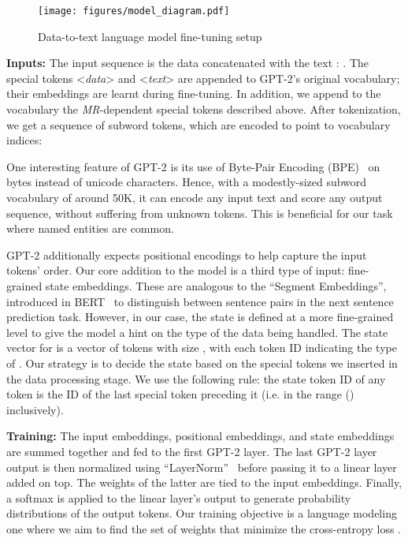 \documentclass[11pt]{article}
\newcommand{\mr}{\textit{MR}\xspace}
\theoremstyle{definition}
\theoremstyle{break}
\newcommand{\specialtoken}[1]{\mbox{\textless \textit{#1}\textgreater}}
\begin{document}
\begin{figure*}[h]
    \centering
    \texttt{[image: figures/model\_diagram.pdf]}
    \caption{Data-to-text language model fine-tuning setup}
    \label{fig:model_diagram}
    \vspace{-0.5\baselineskip}
\end{figure*}


\textbf{Inputs:}
The input sequence is the data  concatenated with the text : .
The special tokens \specialtoken{data} and \specialtoken{text} are appended to GPT-2's original vocabulary; their embeddings are learnt during fine-tuning. 
In addition, we append to the vocabulary the \mr-dependent special tokens described above. After tokenization, we get a sequence  of subword tokens, which are encoded to point to vocabulary indices: 

One interesting feature of GPT-2 is its use of Byte-Pair Encoding (BPE)~\cite{sennrich-etal-2016-neural} on bytes instead of unicode characters. Hence, with a modestly-sized subword vocabulary of around 50K, it can encode any input text and score any output sequence, without suffering from unknown tokens. This is beneficial for our task where named entities are common. 

GPT-2 additionally expects positional encodings to help capture the input tokens' order.
Our core addition to the model is a third type of input: fine-grained state embeddings. These are analogous to the ``Segment Embeddings'', introduced in BERT~\cite{devlin-etal-2019-bert} to distinguish between sentence pairs in the next sentence prediction task. 
However, in our case, the state is defined at a more fine-grained level to give the model a hint on the type of the data being handled. 
The state vector for  is a vector of tokens with size , with each token ID indicating the type of . Our strategy is to decide the state based on the special tokens we inserted in the data processing stage. We use the following rule: the state token ID of any token  is the ID of the last special token preceding it (i.e. in the range () inclusively).


\textbf{Training:} The input embeddings, positional embeddings, and state embeddings are summed together and fed to the first GPT-2 layer. The last GPT-2 layer output is then normalized using ``LayerNorm''~\cite{ba2016layer}
before passing it to a linear layer added on top. The weights of the latter are tied to the input embeddings. 
Finally, a softmax is applied to the linear layer's output to generate probability distributions of the output tokens.
Our training objective is a language modeling one where we aim to find the set of weights  that minimize the cross-entropy loss .
\end{document}
